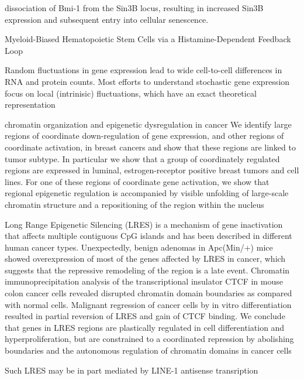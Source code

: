 dissociation of Bmi-1 from the Sin3B locus, resulting in increased Sin3B expression and subsequent entry into cellular senescence\cite{DiMauro2015}.

Myeloid-Biased Hematopoietic Stem Cells via a Histamine-Dependent Feedback Loop\cite{Chen2017c}


Random fluctuations in gene expression lead to wide cell-to-cell differences in RNA and protein counts. Most efforts to understand stochastic gene expression focus on local (intrinisic) fluctuations, which have an exact theoretical representation\cite{Sherman2015}

chromatin organization and epigenetic dysregulation in cancer
We identify large regions of coordinate down-regulation of gene expression, and other regions of coordinate activation, in breast cancers and show that these regions are linked to tumor subtype. In particular we show that a group of coordinately regulated regions are expressed in luminal, estrogen-receptor positive breast tumors and cell lines. For one of these regions of coordinate gene activation, we show that regional epigenetic regulation is accompanied by visible unfolding of large-scale chromatin structure and a repositioning of the region within the nucleus\cite{Rafique2015}

Long Range Epigenetic Silencing (LRES) is a mechanism of gene inactivation that affects multiple contiguous CpG islands and has been described in different human cancer types. 
Unexpectedly, benign adenomas in Apc(Min/+) mice showed overexpression of most of the genes affected by LRES in cancer, which suggests that the repressive remodeling of the region is a late event. Chromatin immunoprecipitation analysis of the transcriptional insulator CTCF in mouse colon cancer cells revealed disrupted chromatin domain boundaries as compared with normal cells. Malignant regression of cancer cells by in vitro differentiation resulted in partial reversion of LRES and gain of CTCF binding. We conclude that genes in LRES regions are plastically regulated in cell differentiation and hyperproliferation, but are constrained to a coordinated repression by abolishing boundaries and the autonomous regulation of chromatin domains in cancer cells\cite{Forn2013}

Such LRES may be in part mediated by LINE-1 antisense transription\cite{Cruickshanks2013a} %


